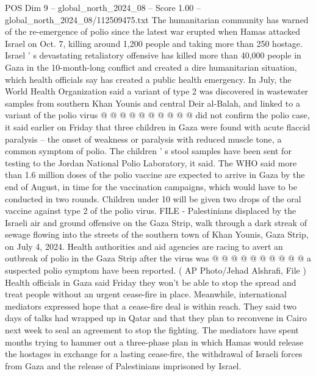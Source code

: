 \begin{textsample}{POS Dim 9 – global\_north\_2024\_08 – Score 1.00 – global\_north\_2024\_08/112509475.txt}
The humanitarian community has warned of the re-emergence of polio since the latest war erupted when Hamas attacked Israel on Oct. 7, killing around 1,200 people and taking more than 250 hostage.
Israel ' s devastating retaliatory offensive has killed more than 40,000 people in Gaza in the 10-month-long conflict and created a dire humanitarian situation, which health officials say has created a public health emergency.
In July, the World Health Organization said a variant of type 2 was discovered in wastewater samples from southern Khan Younis and central Deir al-Balah, and linked to a variant of the polio virus @ @ @ @ @ @ @ @ @ @ did not confirm the polio case, it said earlier on Friday that three children in Gaza were found with acute flaccid paralysis -- the onset of weakness or paralysis with reduced muscle tone, a common symptom of polio.
The children ' s stool samples have been sent for testing to the Jordan National Polio Laboratory, it said.
The WHO said more than 1.6 million doses of the polio vaccine are expected to arrive in Gaza by the end of August, in time for the vaccination campaigns, which would have to be conducted in two rounds.
Children under 10 will be given two drops of the oral vaccine against type 2 of the polio virus.
FILE - Palestinians displaced by the Israeli air and ground offensive on the Gaza Strip, walk through a dark streak of sewage flowing into the streets of the southern town of Khan Younis, Gaza Strip, on July 4, 2024.
Health authorities and aid agencies are racing to avert an outbreak of polio in the Gaza Strip after the virus was @ @ @ @ @ @ @ @ @ @ a suspected polio symptom have been reported. ( AP Photo/Jehad Alshrafi, File ) Health officials in Gaza said Friday they won't be able to stop the spread and treat people without an urgent cease-fire in place.
Meanwhile, international mediators expressed hope that a cease-fire deal is within reach.
They said two days of talks had wrapped up in Qatar and that they plan to reconvene in Cairo next week to seal an agreement to stop the fighting.
The mediators have spent months trying to hammer out a three-phase plan in which Hamas would release the hostages in exchange for a lasting cease-fire, the withdrawal of Israeli forces from Gaza and the release of Palestinians imprisoned by Israel.

\end{textsample}

